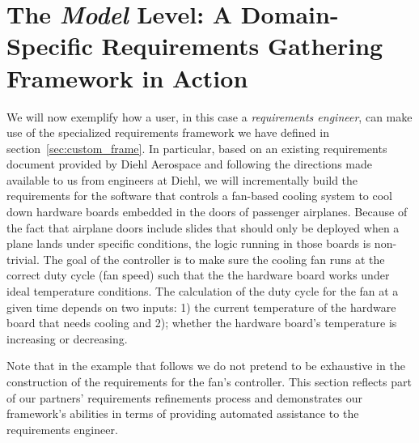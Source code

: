 \section{The \emph{Model} Level: A Domain-Specific Requirements Gathering
Framework in Action}
\label{sec:model}
\vspace{-.5cm}
We will now exemplify how a user, in this case a \emph{requirements engineer},
can make use of the specialized requirements framework we have defined in section~\ref{sec:custom_frame}.
In particular, based on an existing requirements document provided by Diehl
Aerospace and following the directions made available to us from engineers at
Diehl, we will incrementally build the requirements for the software that
controls a fan-based cooling system to cool down hardware boards embedded in
the doors of passenger airplanes.
Because of the fact that airplane doors include slides that should only be
deployed when a plane lands under specific conditions, the logic running in
those boards is non-trivial. The goal of the controller is to make
sure the cooling fan runs at the correct duty cycle (fan speed) such that the 
the hardware board works under ideal temperature conditions. The calculation of
the duty cycle for the fan at a given time depends on two inputs:
1) the current temperature of the hardware board that needs cooling and 2);
whether the hardware board's temperature is increasing or decreasing.
 

Note that in the example that follows we do not pretend to be exhaustive in the
construction of the requirements for the fan's controller. This section
reflects part of our partners' requirements refinements process and demonstrates
our framework's abilities in terms of providing automated assistance to the
requirements engineer. 
\vspace{-.3cm}
